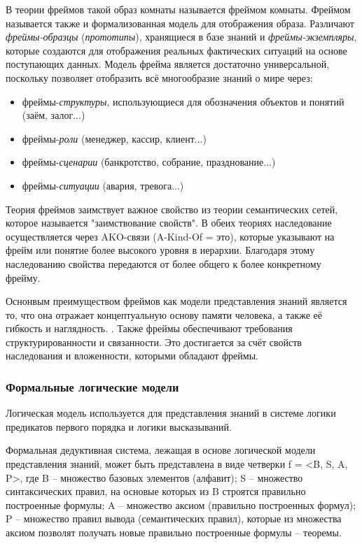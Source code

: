 В теории фреймов такой образ комнаты называется фреймом комнаты. Фреймом называется также и формализованная модель для отображения образа. Различают \textit{фреймы-образцы} (\textit{прототипы}), хранящиеся в базе знаний и \textit{фреймы-экземпляры}, которые создаются для отображения реальных фактических ситуаций на основе поступающих данных. Модель фрейма является достаточно универсальной, поскольку позволяет отобразить всё многообразие знаний о мире через:
\begin{itemize}
    \item фреймы-\textit{структуры}, использующиеся для обозначения объектов и понятий (заём, залог...)
    \item фреймы-\textit{роли} (менеджер, кассир, клиент...)
    \item фреймы-\textit{сценарии} (банкротство, собрание, празднование...)
    \item фреймы-\textit{ситуации} (авария, тревога...)
\end{itemize}

Теория фреймов заимствует важное свойство из теории семантических сетей, которое называется "заимствование свойств". В обеих теориях наследование осуществляется через AKO-связи (A-Kind-Of = это), которые указывают на фрейм или понятие более высокого уровня в иерархии. Благодаря этому наследованию свойства передаются от более общего к более конкретному фрейму. \cite[с.~23-25]{KBIS_Gavrilova}

Оснонвым преимуществом фреймов как модели представления знаний является то, что она отражает концептуальную основу памяти человека, а также её гибкость и наглядность. \cite[с.~25]{KBIS_Gavrilova}. Также фреймы обеспечивают требования структурированности и связанности. Это достигается за счёт свойств наследования и вложенности, которыми обладают фреймы. \cite[с.~17]{Model_Baryshev}

\subsubsection{Формальные логические модели}

Логическая модель используется для представления знаний в системе логики предикатов первого порядка и логики высказываний. 

Формальная дедуктивная система, лежащая в основе логической модели представления знаний, может быть представлена в виде четверки f = <B, S, A, P>, где B -- множество базовых элементов (алфавит); S -- множество синтаксических правил, на основые которых из B строятся правильно построенные формулы; A -- множество аксиом (правильно построенных формул); P -- множество правил вывода (семантических правил), которые из множества аксиом позволят получать новые правильно построенные формулы -- теоремы.

